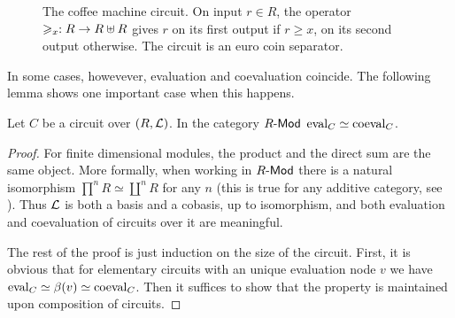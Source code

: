 \begin{figure}[!ht]
  \centering
  
  
  \caption{The coffee machine circuit. On input $r\in R$, the operator
    $\geqslant_x:R\rightarrow R\uplus R$ gives $r$ on its first output if $r\ge x$, on its
    second output otherwise. The circuit is an euro coin separator.}
  \label{fig:coffee}
\end{figure}

In some cases, howevever, evaluation and coevaluation coincide. The
following lemma shows one important case when this happens.

\begin{lemma}
  \label{th:coeval}
  Let $C$ be a circuit over $(R,\mathcal{L})$. In the category $R\text{\sf-Mod}$
  $\operatorname{eval}_C\simeq\operatorname{coeval}_C$.
\end{lemma}
\begin{proof}
  For finite dimensional modules, the product and the direct sum are
  the same object. More formally, when working in $R\text{\sf-Mod}$ there is
  a natural isomorphism $\prod^n R\simeq\coprod^n R$ for any $n$ (this
  is true for any additive category, see \cite[VIII.2]{McLane}). Thus
  $\mathcal{L}$ is both a basis and a cobasis, up to isomorphism, and both
  evaluation and coevaluation of circuits over it are meaningful.

  The rest of the proof is just induction on the size of the
  circuit. First, it is obvious that for elementary circuits with an
  unique evaluation node $v$ we have $\operatorname{eval}_C \simeq \beta(v) \simeq
  \operatorname{coeval}_C$. Then it suffices to show that the property is maintained
  upon composition of circuits.
\end{proof}


